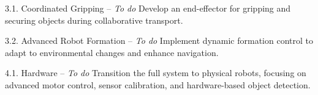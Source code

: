 \begin{description}
    \item 3.1. Coordinated Gripping -- \textit{To do}  
    Develop an end-effector for gripping and securing objects during collaborative transport.

    \item 3.2. Advanced Robot Formation -- \textit{To do}  
    Implement dynamic formation control to adapt to environmental changes and enhance navigation.

    \item 4.1. Hardware -- \textit{To do}  
    Transition the full system to physical robots, focusing on advanced motor control, sensor calibration, and hardware-based object detection.
\end{description}
